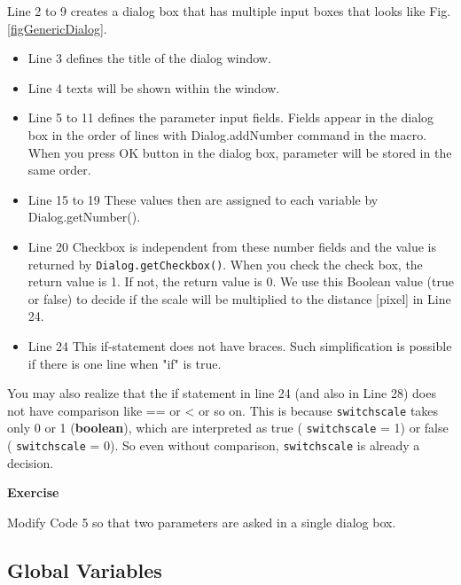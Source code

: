 \documentclass[11pt,a4paper,oneside]{report}
\newenvironment{indentexercise}[1]%
{{\setlength{\leftmargin}{2em}}%
\textbf{Exercise \thesubsection-#1}%
\begin{list}{}%
	\item%
}
{\end{list}}
\newcommand{\ilcom}[1]{\texttt{\small#1}}
\begin{document}
Line 2 to 9 creates a dialog box that has multiple input boxes that looks like Fig. \ref{figGenericDialog}. 

\begin{itemize}
\item Line 3 defines the title of the dialog window. 

\item Line 4 texts will be shown within the window. 

\item Line 5 to 11 defines the parameter input fields. Fields appear in the dialog box in the order of lines with Dialog.addNumber command in the macro. When you press OK button in the dialog box, parameter will be stored in the same order. 

\item Line 15 to 19 These values then are assigned to each variable by Dialog.getNumber(). 

\item Line 20 Checkbox is independent from these number fields and the value is returned by \ilcom{Dialog.getCheckbox()}. When you check the check box, the return value is 1. If not, the return value is 0. We use this Boolean value (true or false)  to decide if the scale will be multiplied to the distance [pixel] in Line 24.

\item Line 24 This if-statement does not have braces. Such simplification is possible if there is one line when "if" is true.  
\end{itemize}

You may also realize that the if statement in line 24 (and also in Line 28) does not have comparison like == or <  or so on. This is because \ilcom{switchscale} takes only 0 or 1 (\textbf{boolean}), which are interpreted as true ( \ilcom{switchscale} = 1) or false ( \ilcom{switchscale} = 0). So even without comparison, \ilcom{switchscale} is already a decision.  

\begin{indentexercise}{1}
Modify Code 5 so that two parameters are asked in a single dialog box. 
\end{indentexercise}

\subsection{Global Variables}
\end{document}
